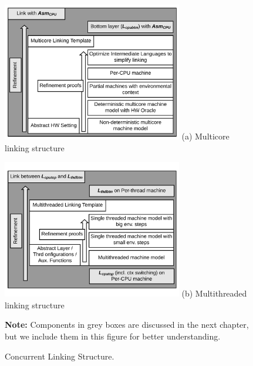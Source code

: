 

\begin{figure}
\begin{center}
\includegraphics[width=0.7\textwidth]{figs/conlink/cpu_linking_structure}\newline
(a) Multicore linking structure
\end{center}
\begin{center}
\includegraphics[width=0.7\textwidth]{figs/conlink/thread_linking_structure}\newline
(b) Multithreaded linking structure
\end{center}
\textbf{Note:} Components in grey boxes are discussed in the next chapter, but we include them in this figure for better understanding.
\caption{Concurrent Linking Structure.}
\label{fig:chapter:conlink:concurrent-linking-structure}
\end{figure}

